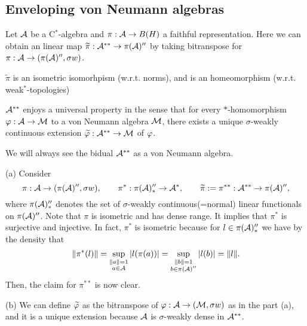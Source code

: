 \documentclass{../../small}
\begin{document}
\subsection{Enveloping von Neumann algebras}

\begin{thm}
Let $\mathcal{A}$ be a C$^*$-algebra and $\pi:\mathcal{A}\to B(H)$ a faithful representation.
Here we can obtain an linear map $\widetilde\pi:\mathcal{A}^{**}\to\pi(\mathcal{A})''$ by taking bitranspose for $\pi:\mathcal{A}\to(\pi(\mathcal{A})'',\sigma w)$.
\begin{parts}
\item $\tilde\pi$ is an isometric isomorhpism (w.r.t. norms), and is an homeomorphism (w.r.t. weak$^*$-topologies)
\item $\mathcal{A}^{**}$ enjoys a universal property in the sense that for every $*$-homomorphism $\varphi:\mathcal{A}\to\mathcal{M}$ to a von Neumann algebra $\mathcal{M}$, there exists a unique $\sigma$-weakly continuous extension $\widetilde{\varphi}:\mathcal{A}^{**}\to\mathcal{M}$ of $\varphi$.
\end{parts}
We will always see the bidual $\mathcal{A}^{**}$ as a von Neumann algebra.
\end{thm}
\begin{pf}
(a)
Consider
\[\pi:\mathcal{A}\to(\pi(\mathcal{A})'',\sigma w),\qquad\pi^*:\pi(\mathcal{A})''_*\to\mathcal{A}^*,\qquad\widetilde\pi:=\pi^{**}:\mathcal{A}^{**}\to\pi(\mathcal{A})'',\]
where $\pi(\mathcal{A})''_*$ denotes the set of $\sigma$-weakly continuous(=normal) linear functionals on $\pi(\mathcal{A})''$.
Note that $\pi$ is isometric and has dense range.
It implies that $\pi^*$ is surjective and injective.
In fact, $\pi^*$ is isometric because for $l\in\pi(\mathcal{A})''_*$ we have by the density that
\[\|\pi^*(l)\|=\sup_{\substack{\|a\|=1\\a\in\mathcal{A}}}|l(\pi(a))|=\sup_{\substack{\|b\|=1\\b\in\pi(\mathcal{A})''}}|l(b)|=\|l\|.\]
Then, the claim for $\pi^{**}$ is now clear.

(b)
We can define $\widetilde{\varphi}$ as the bitranspose of $\varphi:\mathcal{A}\to(\mathcal{M},\sigma w)$ as in the part (a), and it is a unique extension because $\mathcal{A}$ is $\sigma$-weakly dense in $\mathcal{A}^{**}$.
\end{pf}
\end{document}
